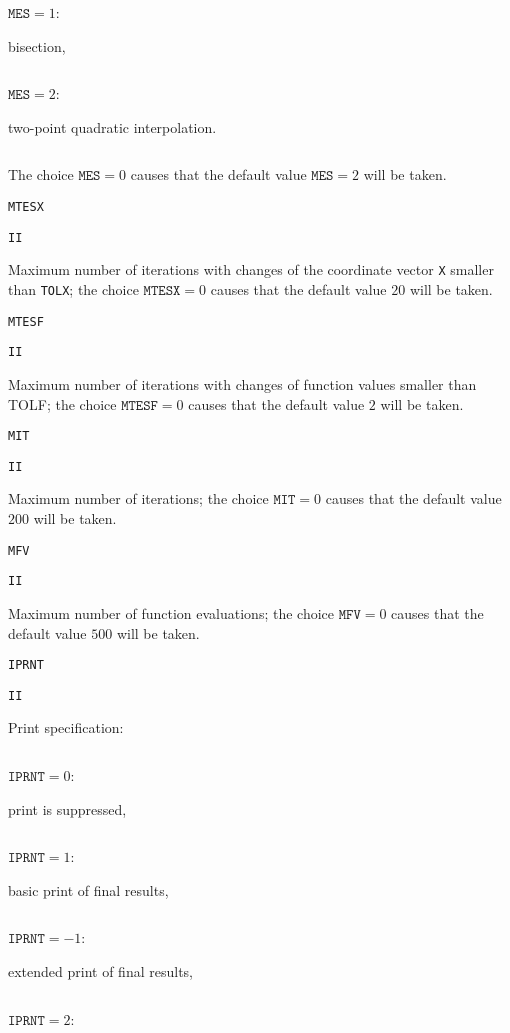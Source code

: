 \documentclass{article}
\begin{document}
{\noindent\parbox{30mm}{$\;$}\parbox{20mm}{$\texttt{MES}=1$:}\parbox[t]{71mm}{
  bisection,}
  \par
\noindent\parbox{30mm}{$\;$}\parbox{20mm}{$\texttt{MES}=2$:}\parbox[t]{71mm}{
  two-point quadratic interpolation.}
  \par\vspace{1mm}
\noindent\parbox{30mm}{$\;$}\parbox[t]{91mm}{The choice $\texttt{MES}=0$
  causes that the default value $\texttt{MES}=2$ will be taken.}
  \par\vspace{2mm}
\noindent\parbox{20mm}{\texttt{MTESX}}\parbox{10mm}{\texttt{II}}\parbox[t]{91mm}{
  Maximum number of iterations with changes
  of the coordinate vector \texttt{X} smaller than \texttt{TOLX}; the choice
  $\texttt{MTESX}=0$ causes that the default value $20$ will be taken.}
  \par\vspace{2mm}
\noindent\parbox{20mm}{\texttt{MTESF}}\parbox{10mm}{\texttt{II}}\parbox[t]{91mm}{
  Maximum number of iterations with changes
  of function values smaller than TOLF; the choice $\texttt{MTESF}=0$ causes that
  the default value $2$ will be taken.}
  \par\vspace{2mm}
\noindent\parbox{20mm}{\texttt{MIT}}\parbox{10mm}{\texttt{II}}\parbox[t]{91mm}{
  Maximum number of iterations; the choice
  $\texttt{MIT}=0$ causes that the default value $200$ will be taken.}
  \par\vspace{2mm}
\noindent\parbox{20mm}{\texttt{MFV}}\parbox{10mm}{\texttt{II}}\parbox[t]{91mm}{
  Maximum number of function evaluations;
  the choice $\texttt{MFV}=0$ causes that the default value $500$ will be taken.}
  \par\vspace{2mm}
\noindent\parbox{20mm}{\texttt{IPRNT}}\parbox{10mm}{\texttt{II}}\parbox[t]{91mm}{
  Print specification:}  \par\vspace{1mm}
\noindent\parbox{30mm}{$\;$}\parbox{20mm}{$\texttt{IPRNT}= 0$:}\parbox[t]{71mm}{
  print is suppressed,}
  \par
\noindent\parbox{30mm}{$\;$}\parbox{20mm}{$\texttt{IPRNT}= 1$:}\parbox[t]{71mm}{
  basic print of final results,}
  \par
\noindent\parbox{30mm}{$\;$}\parbox{20mm}{$\texttt{IPRNT}=-1$:}\parbox[t]{71mm}{
  extended print of final results,}
  \par
\noindent\parbox{30mm}{$\;$}\parbox{20mm}{$\texttt{IPRNT}= 2$:}\parbox[t]{71mm}{
}}
\end{document}
